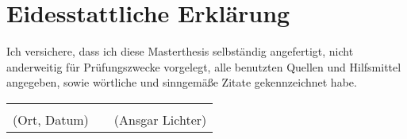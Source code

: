 \setcounter{page}{2}

\chapter*{Eidesstattliche Erklärung}
Ich versichere, dass ich diese Masterthesis selbständig angefertigt, nicht anderweitig für Prüfungszwecke vorgelegt, alle benutzten Quellen und Hilfsmittel angegeben, sowie wörtliche und sinngemäße Zitate gekennzeichnet habe.\\
\linebreak
\linebreak
\linebreak
\noindent
\begin{tabularx}{\linewidth}{Xp{1mm}X}
	\makebox[\linewidth]{\hrulefill} &  & \makebox[\linewidth]{\hrulefill}\\
	\small(Ort, Datum) & & \small(Ansgar Lichter)
\end{tabularx}

\vspace{10mm}

\vfill